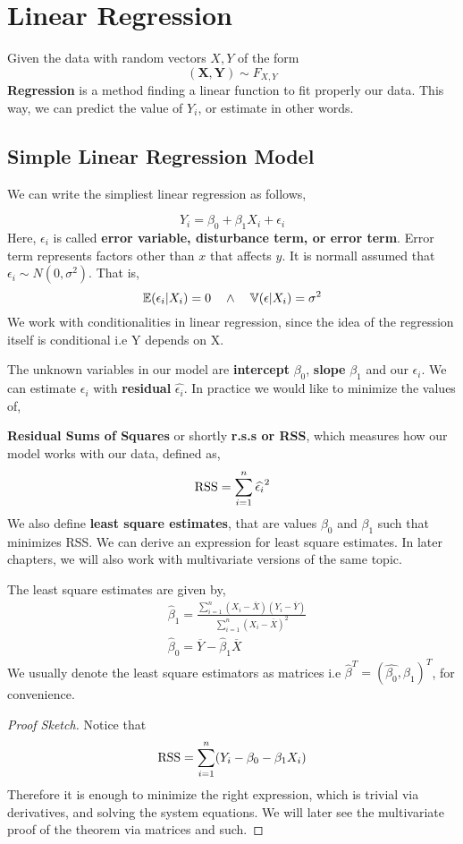 \chapter{Linear Regression}
Given the data with random vectors $X,Y$ of the form
\[ (\mathbf{X}, \mathbf{Y}) \sim F_{X,Y}\]
\textbf{Regression} is a method finding a linear function to fit properly our data. This way, we can predict the value of $Y_i$, or estimate in other words.
\section{Simple Linear Regression Model}
\begin{definition}
We can write the simpliest linear regression as follows,

\[Y_i = \beta_0 + \beta_1X_i + \epsilon_i \]
Here, $\epsilon_i$ is called \textbf{error variable, disturbance term, or error term}. 
Error term represents factors other than $x$ that affects $y$.
It is normall assumed  that $\epsilon_i \sim N(0, \sigma^2)$. That is,
\[ {\mathbb{E}}(\epsilon_i | X_i) = 0 \quad \land \quad {\mathbb{V}}(\epsilon | X_i) = \sigma^2 \]
We work with conditionalities in linear regression, since the idea of the regression itself is conditional i.e Y depends on X.
\end{definition}

The unknown variables in our model are \textbf{intercept} $\beta_0$, \textbf{slope} $\beta_1$ and our $\epsilon_i$. We can estimate $\epsilon_i$ with \textbf{residual} $\widehat{\epsilon_i}$. 
In practice we would like to minimize the values of,
\begin{definition}
    \textbf{Residual Sums of Squares} or shortly \textbf{r.s.s or RSS},
    which measures how our model works with our data, defined as,
    \[\operatorname{RSS} = \sum_{i=1}^n \widehat{\epsilon_i}^2 \]
We also define \textbf{least square estimates}, that are values 
$\beta_0$ and $\beta_1$ such that minimizes RSS.
We can derive an expression for least square estimates. In later chapters, we will also work with multivariate versions of the same topic.
\begin{theorem}
    The least square estimates are given by,
    \begin{align*} &\widehat{\beta}_1 = \frac{\sum_{i = 1}^n(X_i - \overline{X})(Y_i - \overline{Y})}{\sum_{i = 1}^n (X_i - \overline{X})^2} \\
        &\widehat{\beta}_0 = \overline{Y} - \widehat{\beta}_1\overline{X}
\end{align*}
We usually denote the least square estimators as matrices i.e $\widehat{\beta}^T = (\widehat{\beta_0},\widehat{\beta}_1)^T$, for convenience.
\begin{proof}[Proof Sketch]
    Notice that
    \[\operatorname{RSS} = \sum_{i=1}^n (Y_i - \beta_0 -\beta_1X_i) \]
    Therefore it is enough to minimize the right expression, which is trivial via derivatives, and solving the system equations. We will later see the multivariate proof of the theorem via matrices and such.
\end{proof}
\end{theorem}
\end{definition}
